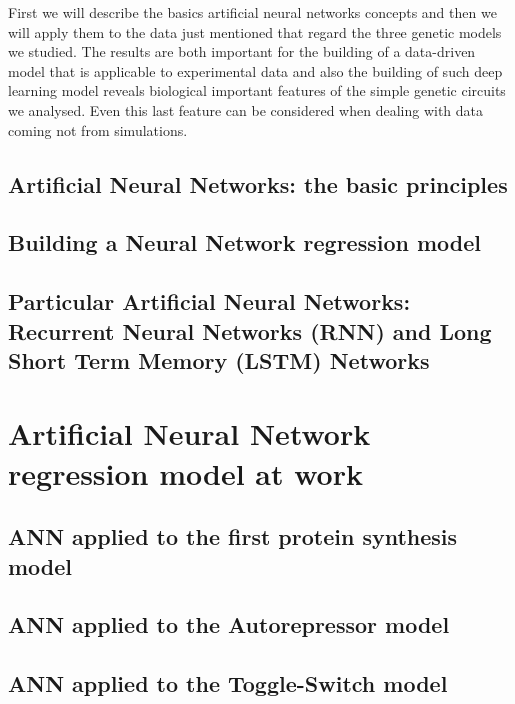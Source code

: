 \documentclass[12pt,a4paper]{report}
\begin{document}
First we will describe the basics artificial neural networks concepts and then we will apply them to the data just mentioned that regard the three genetic models we studied. The results are both important for the building of a data-driven model that is applicable to experimental data and also the building of such deep learning model reveals biological important features of the simple genetic circuits we analysed. Even this last feature can be considered when dealing with data coming not from simulations. 

\section{Artificial Neural Networks: the basic principles}

\section{Building a Neural Network regression model}

\section{Particular Artificial Neural Networks: Recurrent Neural Networks (RNN) and Long Short Term Memory (LSTM) Networks}

\chapter{Artificial Neural Network regression model at work}
\section{ANN applied to the first protein synthesis model}
\section{ANN applied to the Autorepressor model}
\section{ANN applied to the Toggle-Switch model}
\end{document}
